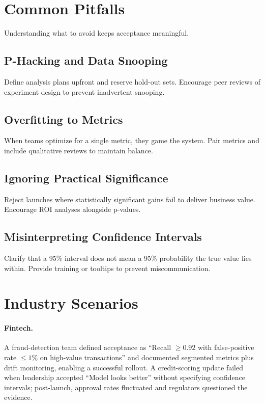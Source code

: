\section{Common Pitfalls}
\label{sec:statistical-pitfalls}

Understanding what to avoid keeps acceptance meaningful.

\subsection{P-Hacking and Data Snooping}
Define analysis plans upfront and reserve hold-out sets. Encourage peer reviews of experiment design to prevent inadvertent snooping.

\subsection{Overfitting to Metrics}
When teams optimize for a single metric, they game the system. Pair metrics and include qualitative reviews to maintain balance.

\subsection{Ignoring Practical Significance}
Reject launches where statistically significant gains fail to deliver business value. Encourage ROI analyses alongside p-values.

\subsection{Misinterpreting Confidence Intervals}
Clarify that a 95\% interval does not mean a 95\% probability the true value lies within. Provide training or tooltips to prevent miscommunication.

\section{Industry Scenarios}
\label{sec:stats-examples}

\paragraph{Fintech.} A fraud-detection team defined acceptance as ``Recall $\ge 0.92$ with false-positive rate $\le 1\%$ on high-value transactions'' and documented segmented metrics plus drift monitoring, enabling a successful rollout. A credit-scoring update failed when leadership accepted ``Model looks better'' without specifying confidence intervals; post-launch, approval rates fluctuated and regulators questioned the evidence.

